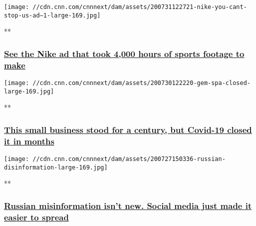 \href{/videos/business/2020/07/31/nike-you-cant-stop-us-ad-orig.cnn-business/video/playlists/business-news/}{}

\texttt{[image: //cdn.cnn.com/cnnnext/dam/assets/200731122721-nike-you-cant-stop-us-ad---1-large-169.jpg]}

**

\hypertarget{see-the-nike-ad-that-took-4000-hours-of-sports-footage-to-make}{%
\subsubsection{\texorpdfstring{\href{/videos/business/2020/07/31/nike-you-cant-stop-us-ad-orig.cnn-business/video/playlists/business-news/}{See
the Nike ad that took 4,000 hours of sports footage to
make}}{See the Nike ad that took 4,000 hours of sports footage to make}}\label{see-the-nike-ad-that-took-4000-hours-of-sports-footage-to-make}}

\href{/videos/business/2020/07/30/small-businesses-restaurants-economy-unemployment-covid-19.cnnbusiness/video/playlists/business-news/}{}

\texttt{[image: //cdn.cnn.com/cnnnext/dam/assets/200730122220-gem-spa-closed-large-169.jpg]}

**

\hypertarget{this-small-business-stood-for-a-century-but-covid-19-closed-it-in-months}{%
\subsubsection{\texorpdfstring{\href{/videos/business/2020/07/30/small-businesses-restaurants-economy-unemployment-covid-19.cnnbusiness/video/playlists/business-news/}{This
small business stood for a century, but Covid-19 closed it in
months}}{This small business stood for a century, but Covid-19 closed it in months}}\label{this-small-business-stood-for-a-century-but-covid-19-closed-it-in-months}}

\href{/videos/business/2020/07/23/russian-disinformation-misinformation-social-media-orig.cnn-business/video/playlists/business-news/}{}

\texttt{[image: //cdn.cnn.com/cnnnext/dam/assets/200727150336-russian-disinformation-large-169.jpg]}

**

\hypertarget{russian-misinformation-isnt-new-social-media-just-made-it-easier-to-spread}{%
\subsubsection{\texorpdfstring{\href{/videos/business/2020/07/23/russian-disinformation-misinformation-social-media-orig.cnn-business/video/playlists/business-news/}{Russian
misinformation isn't new. Social media just made it easier to
spread}}{Russian misinformation isn't new. Social media just made it easier to spread}}\label{russian-misinformation-isnt-new-social-media-just-made-it-easier-to-spread}}

